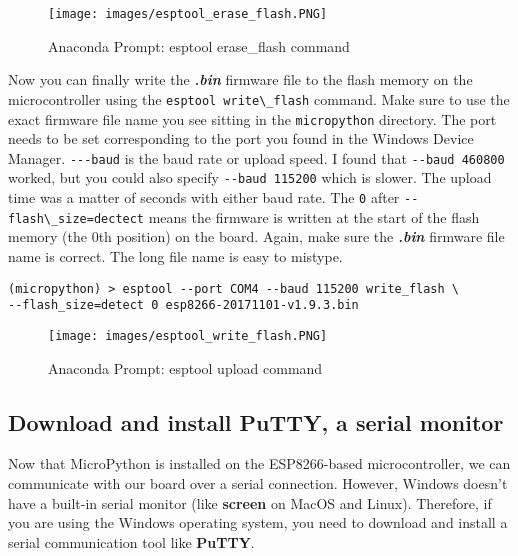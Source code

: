 \documentclass{book}
\makeatletter
\def\maxwidth{\ifdim\Gin@nat@width>\linewidth\linewidth
\else\Gin@nat@width\fi}
\let\Oldincludegraphics\includegraphics
\renewcommand{\includegraphics}[1]{\Oldincludegraphics[width=.8\maxwidth]{#1}}
\newcommand{\passthrough}[1]{#1}
\makeatother
\begin{document}
\begin{figure}
\centering
\texttt{[image: images/esptool\_erase\_flash.PNG]}
\caption{Anaconda Prompt: esptool erase\_flash command}
\end{figure}

Now you can finally write the \textbf{\emph{.bin}} firmware file to the
flash memory on the microcontroller using the
\passthrough{\lstinline!esptool write\_flash!} command. Make sure to use
the exact firmware file name you see sitting in the
\passthrough{\lstinline!micropython!} directory. The port needs to be
set corresponding to the port you found in the Windows Device Manager.
\passthrough{\lstinline!---baud!} is the baud rate or upload speed. I
found that \passthrough{\lstinline!--baud 460800!} worked, but you could
also specify \passthrough{\lstinline!--baud 115200!} which is slower.
The upload time was a matter of seconds with either baud rate. The
\passthrough{\lstinline!0!} after
\passthrough{\lstinline!--flash\_size=dectect!} means the firmware is
written at the start of the flash memory (the 0th position) on the
board. Again, make sure the \textbf{\emph{.bin}} firmware file name is
correct. The long file name is easy to mistype.

\begin{lstlisting}
(micropython) > esptool --port COM4 --baud 115200 write_flash \
--flash_size=detect 0 esp8266-20171101-v1.9.3.bin
\end{lstlisting}

\begin{figure}
\centering
\texttt{[image: images/esptool\_write\_flash.PNG]}
\caption{Anaconda Prompt: esptool upload command}
\end{figure}
    




    
        \hypertarget{download-and-install-putty-a-serial-monitor}{%
\subsection{Download and install PuTTY, a serial
monitor}\label{download-and-install-putty-a-serial-monitor}}
    




    
        Now that MicroPython is installed on the ESP8266-based microcontroller,
we can communicate with our board over a serial connection. However,
Windows doesn't have a built-in serial monitor (like \textbf{screen} on
MacOS and Linux). Therefore, if you are using the Windows operating
system, you need to download and install a serial communication tool
like \textbf{PuTTY}.
\end{document}
